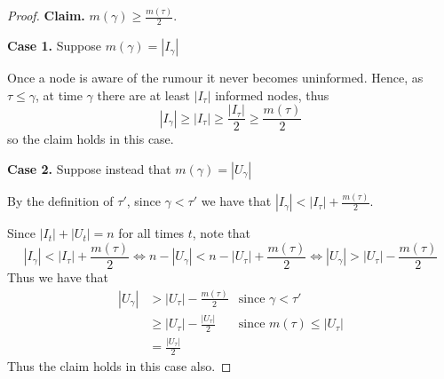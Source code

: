 \begin{proof}
	\textbf{Claim.} $m(\gamma) \geq \frac{m(\tau)}{2}$. %

	\textbf{Case 1.} Suppose $m(\gamma) = |I_\gamma|$

	\noindent
	Once a node is aware of the rumour it never becomes uninformed. Hence, as $\tau \leq \gamma$, at time $\gamma$ there are at least $|I_\tau|$ informed nodes, thus 
	$$
	|I_\gamma| \geq |I_\tau| \geq \frac{|I_\tau|}{2} \geq \frac{m(\tau)}{2}
	$$
	so the claim holds in this case.

	\textbf{Case 2.} Suppose instead that $m(\gamma) = |U_\gamma|$

	\noindent
	By the definition of $\tau'$, since $\gamma < \tau'$ we have that $|I_{\gamma}| < |I_\tau| + \frac{m(\tau)}{2}$.

	Since $|I_t| + |U_t| = n$ for all times $t$, note that
	$$
		|I_{\gamma}| < |I_\tau| + \frac{m(\tau)}{2} 
		\iff
		n - |U_{\gamma}| < n - |U_\tau| + \frac{m(\tau)}{2} 
		\iff
		|U_\gamma| > |U_\tau| - \frac{m(\tau)}{2}
	$$
	Thus we have that
	\begin{align*}
		|U_\gamma| & > |U_\tau| - \frac{m(\tau)}{2} & \text{since }\gamma < \tau' \\
		& \geq |U_\tau| - \frac{|U_\tau|}{2} & \text{since } m(\tau) \leq |U_\tau| \\
		& = \frac{|U_\tau|}{2} 
	\end{align*}
	Thus the claim holds in this case also.
	

\end{proof}
